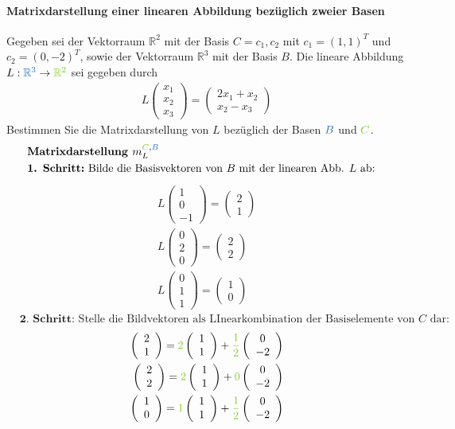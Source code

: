 \documentclass[12pt,a4paper]{report}%
\numberwithin{equation}{section}
\newcommand{\R}{\mathbb{R}} %
\newcommand{\subsubsubsection}{\paragraph}
\def\colGreen#1{\begingroup\color{LimeGreen}{#1}\endgroup}
\def\colBlue#1{\begingroup\color{NavyBlue}{#1}\endgroup}
\def\vecT#1{\left(\begin{array}{c} #1 \end{array}\right)}
\numberwithin{equation}{subsection}
\begin{document}
		   \subsubsubsection{Matrixdarstellung einer linearen Abbildung bezüglich zweier Basen}
		   Gegeben sei der Vektorraum $\R^2$ mit der Basis $C = {c_1, c_2}$ mit $c_1 = (1,1)^T$ und $c_2 = (0,-2)^T$, sowie der Vektorraum $\R^3$ mit der Basis $B$. Die lineare Abbildung $L: \colBlue{\R^3} \rightarrow \colGreen{\R^2}$ sei gegeben durch
		   \begin{align*}
		     L\left(\begin{array}{c} x_1 \\ x_2 \\ x_3  \end{array}\right) 
		     = \left(\begin{array}{c} 2x_1+x_2 \\ x_2 - x_3  \end{array} \right)
		   \end{align*}
		   Bestimmen Sie die Matrixdarstellung von $L$ bezüglich der Basen $\colBlue{B}$ und $\colGreen{C}$.
		   \begin{align*}
		     &\textbf{Matrixdarstellung } m_L^{\colGreen{C},\colBlue{B}} &\nonumber \\
		     &\textbf{1. Schritt:} \text{ Bilde die Basisvektoren von $B$ mit der linearen Abb. $L$ ab:}&
		   \end{align*}
		   \begin{align}
		     L\vecT{1\\0\\-1} = \vecT{2\\1} \nonumber \\
		     L\vecT{0\\2\\0} = \vecT{2\\2} \nonumber \\
		     L\vecT{0\\1\\1} = \vecT{1\\0} \nonumber 
		  \end{align}
		  \begin{align*}
		     &\textbf{2. Schritt: } \text{Stelle die Bildvektoren als LInearkombination der Basiselemente von $C$ dar:}& \nonumber 
		  \end{align*}
		  \begin{align}
		     \vecT{2\\1} = \colGreen{2}\vecT{1\\1} + \colGreen{\frac{1}{2}} \vecT{0\\-2} \nonumber\\
		     \vecT{2\\2} = \colGreen{2}\vecT{1\\1} + \colGreen{0} \vecT{0\\-2} \nonumber\\
		     \vecT{1\\0} = \colGreen{1}\vecT{1\\1} + \colGreen{\frac{1}{2}} \vecT{0\\-2} \nonumber
		  \end{align}
\end{document}
